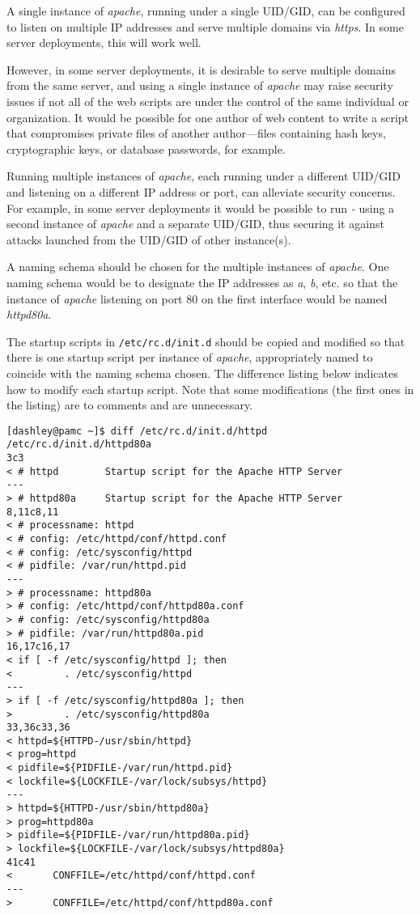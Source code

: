 A single instance of \emph{apache}, running under a single UID/GID,
can be configured to listen on multiple IP addresses and
serve multiple domains via \emph{https}.  In some server deployments,
this will work well.

However, in some server deployments, it is desirable to serve multiple
domains from the same server, and using a single instance
of \emph{apache} may raise security issues if not
all of the web scripts are under the control of the same individual
or organization.  It would be possible for one author of web content
to write a script that compromises private files of another author---files
containing hash keys, cryptographic keys, or database passwords, for example.

Running multiple instances of \emph{apache}, each running under a different
UID/GID and listening on a different IP address or port, can alleviate
security concerns.  For example, in some server deployments it would be
possible to run \emph{\productbasename{}-\productversion{}} using a second
instance of \emph{apache} and a separate UID/GID, thus securing it against
attacks launched from the UID/GID of other instance(s).

A naming schema should be chosen for the multiple 
instances of \emph{apache}.  One naming schema would be to designate
the IP addresses as \emph{a}, \emph{b}, etc. so that the
instance of \emph{apache} listening on port 80 on the first interface
would be named \emph{httpd80a}.

The startup scripts in \texttt{/etc/rc.d/init.d} should be copied and modified
so that there is one startup script per instance of \emph{apache},
appropriately named to coincide with the naming schema chosen.
The difference listing below indicates how to modify each startup
script.  Note that some modifications (the first ones in the listing)
are to comments and are unnecessary.

\begin{small}
\begin{verbatim}
[dashley@pamc ~]$ diff /etc/rc.d/init.d/httpd /etc/rc.d/init.d/httpd80a
3c3
< # httpd        Startup script for the Apache HTTP Server
---
> # httpd80a     Startup script for the Apache HTTP Server
8,11c8,11
< # processname: httpd
< # config: /etc/httpd/conf/httpd.conf
< # config: /etc/sysconfig/httpd
< # pidfile: /var/run/httpd.pid
---
> # processname: httpd80a
> # config: /etc/httpd/conf/httpd80a.conf
> # config: /etc/sysconfig/httpd80a
> # pidfile: /var/run/httpd80a.pid
16,17c16,17
< if [ -f /etc/sysconfig/httpd ]; then
<         . /etc/sysconfig/httpd
---
> if [ -f /etc/sysconfig/httpd80a ]; then
>         . /etc/sysconfig/httpd80a
33,36c33,36
< httpd=${HTTPD-/usr/sbin/httpd}
< prog=httpd
< pidfile=${PIDFILE-/var/run/httpd.pid}
< lockfile=${LOCKFILE-/var/lock/subsys/httpd}
---
> httpd=${HTTPD-/usr/sbin/httpd80a}
> prog=httpd80a
> pidfile=${PIDFILE-/var/run/httpd80a.pid}
> lockfile=${LOCKFILE-/var/lock/subsys/httpd80a}
41c41
<       CONFFILE=/etc/httpd/conf/httpd.conf
---
>       CONFFILE=/etc/httpd/conf/httpd80a.conf
\end{verbatim}
\end{small}

